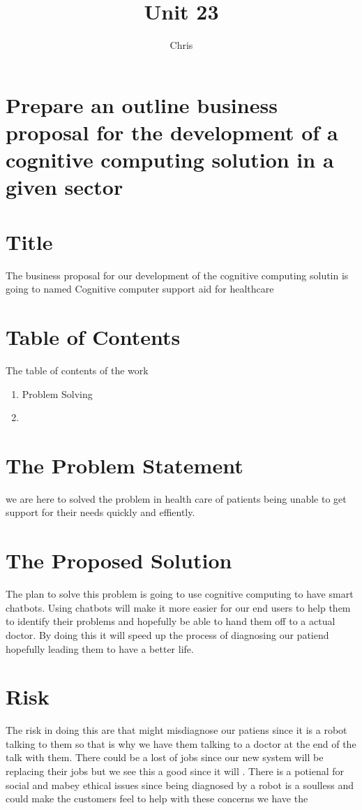\documentclass{article}
\title{Unit 23}
\author{Chris}
\date{}
\begin{document}
\section{Prepare an outline business proposal for the development of a cognitive computing solution in a given sector}

\section{Title}
The business proposal for our development of the cognitive computing solutin is going to named 
Cognitive computer support aid for healthcare

\section{Table of Contents}
The table of contents of the work
\begin{enumerate}
	\item	Problem Solving
	\item	
\end{enumerate}

\section{The Problem Statement}
we are here to solved the problem in health care of patients being unable to get support for their needs quickly and effiently.

\section{The Proposed Solution}
The plan to solve this problem is going to use cognitive computing to have smart chatbots. Using chatbots will make it more easier for our end users to help them to identify their problems and hopefully be able to hand them off to a actual doctor. By doing this it will speed up the process of diagnosing our patiend hopefully leading them to have a better life.

\section{Risk}
The risk in doing this are that might misdiagnose our patiens since it is a robot talking to them so that is why we have them talking to a doctor at the end of the talk with them. There could be a lost of jobs since our new system will be replacing their jobs but we see this a good since it will   . 
There is a potienal for social and mabey ethical issues since being diagnosed by a robot is a soulless and could make the customers feel to help with these concerns we have the 
\end{document}
